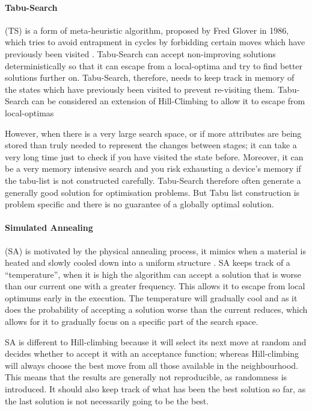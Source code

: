 \documentclass{article}
\begin{document}
\paragraph{Tabu-Search} (TS) is a form of meta-heuristic algorithm, proposed by Fred Glover in 1986, which tries to avoid entrapment in cycles by forbidding certain moves which have previously been visited \cite{RN35} \cite{RN37}. Tabu-Search can accept non-improving solutions deterministically so that it can escape from a local-optima and try to find better solutions further on. Tabu-Search, therefore, needs to keep track in memory of the states which have previously been visited to prevent re-visiting them. Tabu-Search can be considered an extension of Hill-Climbing to allow it to escape from local-optimas


\par 
However, when there is a very large search space, or if more attributes are being stored than truly needed to represent the changes between stages; it can take a very long time just to check if you have visited the state before. Moreover, it can be a very memory intensive search and you risk exhausting a device's memory if the tabu-list is not constructed carefully. Tabu-Search therefore often generate a generally good solution for optimisation problems. But Tabu list construction is problem specific and there is no guarantee of a globally optimal solution. 


\paragraph{Simulated Annealing} (SA) is motivated by the physical annealing process, it mimics when a material is heated and slowly cooled down into a uniform structure \cite{RN35}. SA keeps track of a ``temperature'', when it is high the algorithm can accept a solution that is worse than our current one with a greater frequency. This allows it to escape from local optimums early in the execution. The temperature will gradually cool and as it does the probability of accepting a solution worse than the current reduces, which allows for it to gradually focus on a specific part of the search space.

\par 
SA is different to Hill-climbing because it will select its next move at random and decides whether to accept it with an acceptance function; whereas Hill-climbing will always choose the best move from all those available in the neighbourhood. This means that the results are generally not reproducible, as randomness is introduced. It should also keep track of what has been the best solution so far, as the last solution is not necessarily going to be the best.
\end{document}
